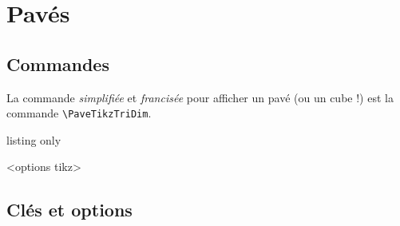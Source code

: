 \documentclass[french,a4paper,11pt]{article}
\begin{document}
\begin{PresCode}{}
\begin{EnvTikzEspace}[VueClassique]
\end{EnvTikzEspace}
\end{PresCode}

\pagebreak

\section{Pavés}

\subsection{Commandes}

\begin{cautionblock}
La commande \textit{simplifiée} et \textit{francisée} pour afficher un pavé (ou un cube !) est la commande \texttt{\textbackslash PaveTikzTriDim}.
\end{cautionblock}

\begin{PresCodeTex}{listing only}
\begin{EnvTikzEspace}[Clés]<options tikz>
	\PaveTikzTriDim[clés]
\end{EnvTikzEspace}
\end{PresCodeTex}

\begin{PresCode}{}
\begin{EnvTikzEspace}[VueClassique]
	\PaveTikzTriDim
\end{EnvTikzEspace}
\hspace{1cm}
\begin{EnvTikzEspace}
	\PaveTikzTriDim
\end{EnvTikzEspace}
\end{PresCode}

\subsection{Clés et options}
\end{document}

